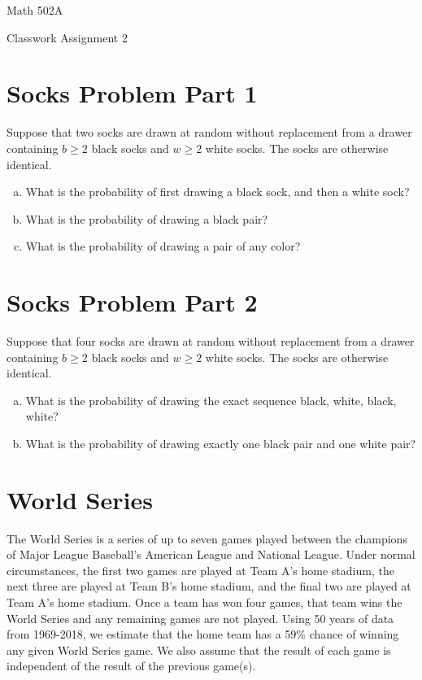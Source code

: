 \documentclass{article}
\begin{document}
\begin{center}
{\Huge {Math 502A}}

\vspace{0.2in}

{\Large {Classwork Assignment 2}}
\end{center}

\vspace{0.1in}

\section{Socks Problem Part 1}

Suppose that two socks are drawn at random without replacement from a drawer containing $b \geq 2$ black socks and $w \geq 2$ white socks. The socks are otherwise identical.

\begin{enumerate}[(a)]
\item What is the probability of first drawing a black sock, and then a white sock?
\item What is the probability of drawing a black pair?
\item What is the probability of drawing a pair of any color?
\end{enumerate}

\section{Socks Problem Part 2}

Suppose that four socks are drawn at random without replacement from a drawer containing $b \geq 2$ black socks and $w \geq 2$ white socks. The socks are otherwise identical.

\begin{enumerate}[(a)]
\item What is the probability of drawing the exact sequence black, white, black, white?
\item What is the probability of drawing exactly one black pair and one white pair?
\end{enumerate}

\section {World Series}

The World Series is a series of up to seven games played between the champions of Major League Baseball's American League and National League. Under normal circumstances, the first two games are played at Team A's home stadium, the next three are played at Team B's home stadium, and the final two are played at Team A's home stadium. Once a team has won four games, that team wins the World Series and any remaining games are not played. Using 50 years of data from 1969-2018, we estimate that the home team has a 59\% chance of winning any given World Series game. We also assume that the result of each game is independent of the result of the previous game(s). 
\end{document}
